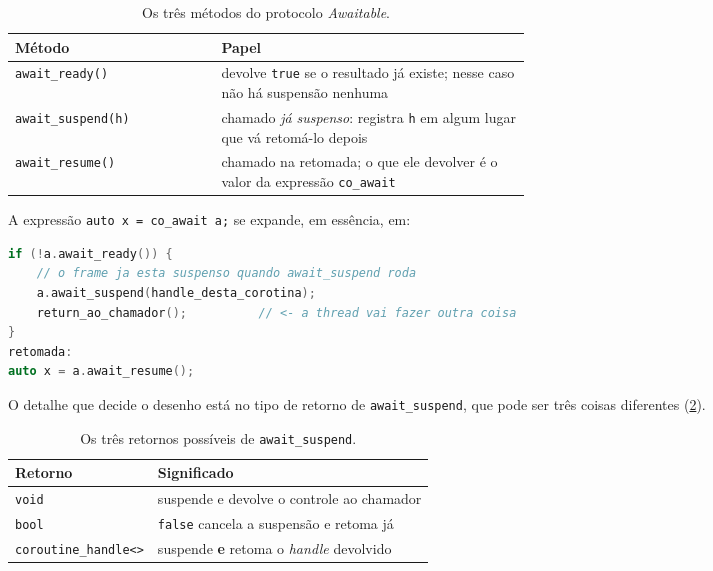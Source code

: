 \begin{table}[htbp]
\centering
\caption{Os três métodos do protocolo \emph{Awaitable}.}
\label{tab:awaitable}
\footnotesize
\begin{tabular}{@{}lp{0.60\linewidth}@{}}
\toprule
\textbf{Método} & \textbf{Papel} \\
\midrule
\texttt{await\_ready()}       & devolve \texttt{true} se o resultado já existe;
                                nesse caso não há suspensão nenhuma \\
\texttt{await\_suspend(h)}    & chamado \emph{já suspenso}: registra \texttt{h}
                                em algum lugar que vá retomá-lo depois \\
\texttt{await\_resume()}      & chamado na retomada; o que ele devolver é o
                                valor da expressão \texttt{co\_await} \\
\bottomrule
\end{tabular}
\end{table}

A expressão \texttt{auto x = co\_await a;} se expande, em essência, em:

\begin{lstlisting}[style=bt, language=C++,
    caption={O que o compilador gera para um \texttt{co\_await}.}]
if (!a.await_ready()) {
    // o frame ja esta suspenso quando await_suspend roda
    a.await_suspend(handle_desta_corotina);
    return_ao_chamador();          // <- a thread vai fazer outra coisa
}
retomada:
auto x = a.await_resume();
\end{lstlisting}

O detalhe que decide o desenho está no tipo de retorno de
\texttt{await\_suspend}, que pode ser três coisas diferentes
(\cref{tab:await-suspend}).

\begin{table}[htbp]
\centering
\caption{Os três retornos possíveis de \texttt{await\_suspend}.}
\label{tab:await-suspend}
\footnotesize
\begin{tabular}{@{}ll@{}}
\toprule
\textbf{Retorno} & \textbf{Significado} \\
\midrule
\texttt{void}                & suspende e devolve o controle ao chamador \\
\texttt{bool}                & \texttt{false} cancela a suspensão e retoma já \\
\texttt{coroutine\_handle<>} & suspende \textbf{e} retoma o \emph{handle} devolvido \\
\bottomrule
\end{tabular}
\end{table}

